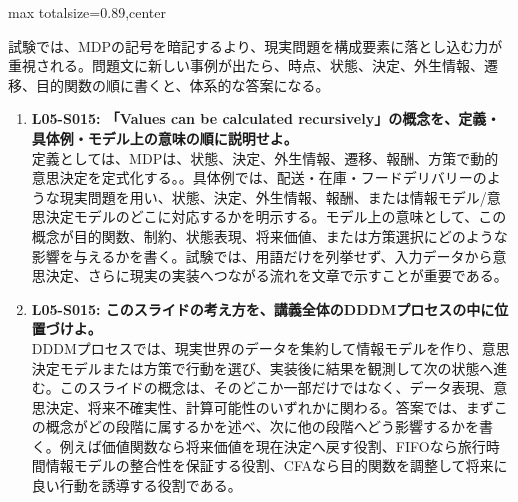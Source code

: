 \begin{minipage}[t]{0.58\textwidth}
\begin{adjustbox}{max totalsize={\textwidth}{0.89\textheight},center}
\begin{minipage}{\textwidth}
試験では、MDPの記号を暗記するより、現実問題を構成要素に落とし込む力が重視される。問題文に新しい事例が出たら、時点、状態、決定、外生情報、遷移、目的関数の順に書くと、体系的な答案になる。\par{}\begin{enumerate}\item \textbf{L05-S015: 「Values can be calculated recursively」の概念を、定義・具体例・モデル上の意味の順に説明せよ。}\\定義としては、MDPは、状態、決定、外生情報、遷移、報酬、方策で動的意思決定を定式化する。。具体例では、配送・在庫・フードデリバリーのような現実問題を用い、状態、決定、外生情報、報酬、または情報モデル/意思決定モデルのどこに対応するかを明示する。モデル上の意味として、この概念が目的関数、制約、状態表現、将来価値、または方策選択にどのような影響を与えるかを書く。試験では、用語だけを列挙せず、入力データから意思決定、さらに現実の実装へつながる流れを文章で示すことが重要である。\item \textbf{L05-S015: このスライドの考え方を、講義全体のDDDMプロセスの中に位置づけよ。}\\DDDMプロセスでは、現実世界のデータを集約して情報モデルを作り、意思決定モデルまたは方策で行動を選び、実装後に結果を観測して次の状態へ進む。このスライドの概念は、そのどこか一部だけではなく、データ表現、意思決定、将来不確実性、計算可能性のいずれかに関わる。答案では、まずこの概念がどの段階に属するかを述べ、次に他の段階へどう影響するかを書く。例えば価値関数なら将来価値を現在決定へ戻す役割、FIFOなら旅行時間情報モデルの整合性を保証する役割、CFAなら目的関数を調整して将来に良い行動を誘導する役割である。\end{enumerate}
\end{minipage}
\end{adjustbox}
\end{minipage}


